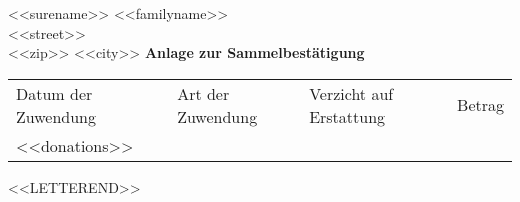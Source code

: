 \documentclass[fontsize=11pt, twoside]{scrlttr2}
\begin{document}
\begin{letter}{<<surename>> <<familyname>>\\<<street>>\\<<zip>> <<city>>}
\newpage\normalsize
\textbf{Anlage zur Sammelbestätigung}

\noindent\begin{tabular}{lllr}
Datum der Zuwendung & Art der Zuwendung & Verzicht auf Erstattung & Betrag \\ \addlinespace
<<donations>>
\end{tabular}

\end{letter}

<<LETTEREND>>
\end{document}
